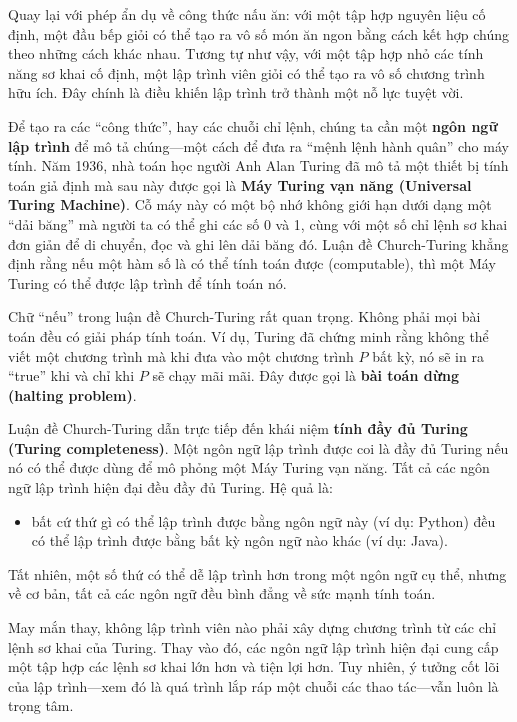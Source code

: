 Quay lại với phép ẩn dụ về công thức nấu ăn: với một tập hợp nguyên liệu cố định, một đầu bếp giỏi có thể tạo ra vô số món ăn ngon bằng cách kết hợp chúng theo những cách khác nhau. Tương tự như vậy, với một tập hợp nhỏ các tính năng sơ khai cố định, một lập trình viên giỏi có thể tạo ra vô số chương trình hữu ích. Đây chính là điều khiến lập trình trở thành một nỗ lực tuyệt vời.

Để tạo ra các ``công thức'', hay các chuỗi chỉ lệnh, chúng ta cần một \textbf{ngôn ngữ lập trình} để mô tả chúng—một cách để đưa ra ``mệnh lệnh hành quân'' cho máy tính. Năm 1936, nhà toán học người Anh Alan Turing đã mô tả một thiết bị tính toán giả định mà sau này được gọi là \textbf{Máy Turing vạn năng (Universal Turing Machine)}. Cỗ máy này có một bộ nhớ không giới hạn dưới dạng một ``dải băng'' mà người ta có thể ghi các số 0 và 1, cùng với một số chỉ lệnh sơ khai đơn giản để di chuyển, đọc và ghi lên dải băng đó. Luận đề Church-Turing khẳng định rằng nếu một hàm số là có thể tính toán được (computable), thì một Máy Turing có thể được lập trình để tính toán nó.

Chữ ``nếu'' trong luận đề Church-Turing rất quan trọng. Không phải mọi bài toán đều có giải pháp tính toán. Ví dụ, Turing đã chứng minh rằng không thể viết một chương trình mà khi đưa vào một chương trình $P$ bất kỳ, nó sẽ in ra ``true'' khi và chỉ khi $P$ sẽ chạy mãi mãi. Đây được gọi là \textbf{bài toán dừng (halting problem)}.

Luận đề Church-Turing dẫn trực tiếp đến khái niệm \textbf{tính đầy đủ Turing (Turing completeness)}. Một ngôn ngữ lập trình được coi là đầy đủ Turing nếu nó có thể được dùng để mô phỏng một Máy Turing vạn năng. Tất cả các ngôn ngữ lập trình hiện đại đều đầy đủ Turing. Hệ quả là:

\begin{itemize}
    \item bất cứ thứ gì có thể lập trình được bằng ngôn ngữ này (ví dụ: Python) đều có thể lập trình được bằng bất kỳ ngôn ngữ nào khác (ví dụ: Java).
\end{itemize}

Tất nhiên, một số thứ có thể dễ lập trình hơn trong một ngôn ngữ cụ thể, nhưng về cơ bản, tất cả các ngôn ngữ đều bình đẳng về sức mạnh tính toán.

May mắn thay, không lập trình viên nào phải xây dựng chương trình từ các chỉ lệnh sơ khai của Turing. Thay vào đó, các ngôn ngữ lập trình hiện đại cung cấp một tập hợp các lệnh sơ khai lớn hơn và tiện lợi hơn. Tuy nhiên, ý tưởng cốt lõi của lập trình—xem đó là quá trình lắp ráp một chuỗi các thao tác—vẫn luôn là trọng tâm.

